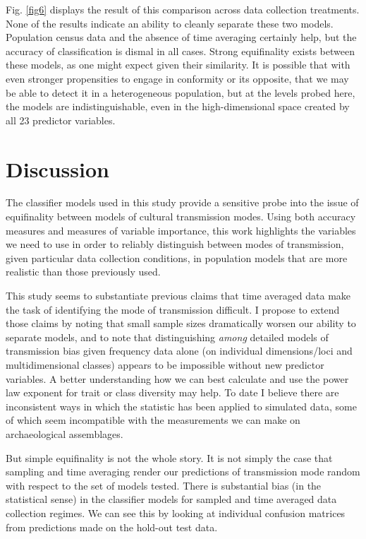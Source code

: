 \documentclass[10pt,letterpaper]{article}
\begin{document}
Fig. \ref{fig6} displays the result of this comparison across data collection treatments.  None of the results indicate an ability to cleanly separate these two models.  Population census data and the absence of time averaging certainly help, but the accuracy of classification is dismal in all cases.  Strong equifinality exists between these models, as one might expect given their similarity.  It is possible that with even stronger propensities to engage in conformity or its opposite, that we may be able to detect it in a heterogeneous population, but at the levels probed here, the models are indistinguishable, even in the high-dimensional space created by all 23 predictor variables.  


\section{Discussion}\label{discussion}

The classifier models used in this study provide a sensitive probe into the issue of equifinality between models of cultural transmission modes.  Using both accuracy measures and measures of variable importance, this work highlights the variables we need to use in order to reliably distinguish between modes of transmission, given particular data collection conditions, in population models that are more realistic than those previously used.  

This study seems to substantiate previous claims that time averaged data make the task of identifying the mode of transmission difficult.  I propose to extend those claims by noting that small sample sizes dramatically worsen our ability to separate models, and to note that distinguishing \emph{among} detailed models of transmission bias given frequency data alone (on individual dimensions/loci and multidimensional classes) appears to be impossible without new predictor variables.  A better understanding how we can best calculate and use the power law exponent for trait or class diversity may help.  To date I believe there are inconsistent ways in which the statistic has been applied to simulated data, some of which seem incompatible with the measurements we can make on archaeological assemblages.  

But simple equifinality is not the whole story.  It is not simply the case that sampling and time averaging render our predictions of transmission mode random with respect to the set of models tested.  There is substantial bias (in the statistical sense) in the classifier models for sampled and time averaged data collection regimes.  We can see this by looking at individual confusion matrices from predictions made on the hold-out test data.
\end{document}
